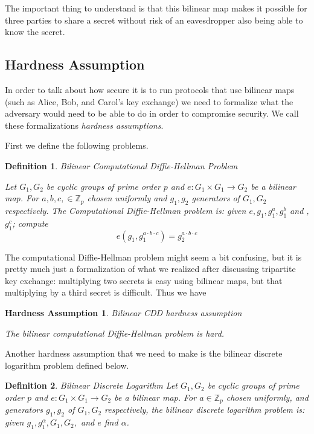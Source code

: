 \documentclass[12pt,twoside]{reedthesis}
\newtheorem{definition}{Definition}
\newtheorem{assumption}{Hardness Assumption}
\newcommand{\Z}[0]{\mathbb{Z}}
\begin{document}
\par The important thing to understand is that this bilinear map makes it possible for three parties to share a secret without risk of an eavesdropper also being able to know the secret. 


    \subsection{Hardness Assumption}
    
    In order to talk about how secure it is to run protocols that use bilinear maps (such as Alice, Bob, and Carol's key exchange) we need to formalize what the adversary would need to be able to do in order to compromise security. We call these formalizations \textit{hardness assumptions}.
    \par First we define the following problems.
    
    \begin{definition}{Bilinear Computational Diffie-Hellman Problem}
    \par Let $G_1,G_2$ be cyclic groups of prime order $p$ and $e:G_1 \times G_1 \to G_2$ be a bilinear map. For $a,b,c,\in \Z_p$ chosen uniformly and $g_1,g_2$ generators of $G_1,G_2$ respectively. The Computational Diffie-Hellman problem is: given $e,g_1,g_1^a,g_1^b$ and ,$g_1^c$; compute $$e(g_1,g_1^{a\cdot b \cdot c}) = g_2^{a\cdot b \cdot c}$$
    \end{definition}
    
    The computational Diffie-Hellman problem might seem a bit confusing, but it is pretty much just a formalization of what we realized after discussing tripartite key exchange: multiplying two secrets is easy using bilinear maps, but that multiplying by a third secret is difficult. Thus we have
    \begin{assumption}{Bilinear CDD hardness assumption}
    \par The bilinear computational Diffie-Hellman problem is hard.
        \end{assumption}
        
        \par Another hardness assumption that we need to make is the bilinear discrete logarithm problem defined below.
       
    \begin{definition}{Bilinear Discrete Logarithm}
    Let $G_1,G_2$ be cyclic groups of prime order $p$ and $e:G_1 \times G_1 \to G_2$ be a bilinear map. For $a \in \Z_p$ chosen uniformly, and generators $g_1,g_2$ of $G_1,G_2$ respectively, the bilinear discrete logarithm problem is: given $g_1,g_1^\alpha, G_1, G_2,$ and $e$ find $\alpha$.
    \end{definition}
    
\end{document}
